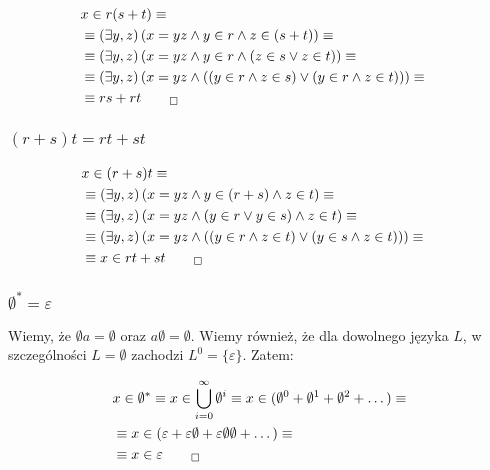 \documentclass[12pt]{article}
\begin{document}
\begin{align}
    &x\in r(s+t) \equiv&\\
    &\equiv \left(\exists y,z \right)\left(x=yz \land y\in r \land z\in (s+t)\right) \equiv\\
    &\equiv \left(\exists y,z \right)\left(x=yz \land y\in r \land \left(z\in s \lor z\in t\right)\right) \equiv\\
    &\equiv \left(\exists y,z \right)\left(x=yz \land \left(\left(y\in r \land z\in s\right) \lor \left(y\in r \land z\in t\right)\right)\right) \equiv\\
    &\equiv rs + rt_{\qed}
\end{align}

\subsubsection{$(r+s)t = rt + st$}

\begin{align}
    &x\in (r+s)t \equiv&\\
    &\equiv \left(\exists y,z \right)\left(x=yz \land y\in (r+s) \land z\in t\right) \equiv\\
    &\equiv \left(\exists y,z \right)\left(x=yz \land \left(y\in r \lor y\in s\right) \land z\in t\right) \equiv\\
    &\equiv \left(\exists y,z \right)\left(x=yz \land \left(\left(y\in r \land z\in t\right) \lor \left(y\in s \land z\in t\right)\right)\right) \equiv\\
    &\equiv x\in rt + st_{\qed}
\end{align}

\subsubsection{$\emptyset^{*} = \varepsilon$}

Wiemy, że $\emptyset a = \emptyset$ oraz $a\emptyset = \emptyset$.
Wiemy również, że dla dowolnego języka $L$, w szczególności $L=\emptyset$ zachodzi $L^{0} = \{\varepsilon\}$. Zatem:

\begin{align}
    &x\in \emptyset^{*} \equiv
    x\in \bigcup_{i=0}^{\infty} \emptyset^{i} \equiv
    x\in (\emptyset^{0} + \emptyset^{1} + \emptyset^{2} + \dots) \equiv\\
    &\equiv x \in (\varepsilon + \varepsilon\emptyset + \varepsilon\emptyset\emptyset + \dots) \equiv\\
    &\equiv x \in \varepsilon_{\qed}
\end{align}
\end{document}
